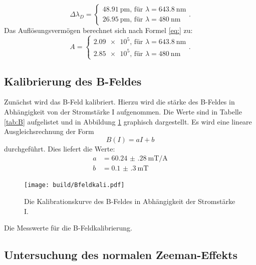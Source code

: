 \[
\Delta\lambda_D =
\begin{cases}
\SI{48.91}{\pico\metre} \text{, für }\lambda=\SI{643.8}{\nano\metre}\\
\SI{26.95}{\pico\metre} \text{, für }\lambda=\SI{480}{\nano\metre}
\end{cases}\text{.}
\]
Das Auflösungsvermögen berechnet sich nach Formel \eqref{eq:} zu:
\[
A = 
\begin{cases}
\num{2.09e5} \text{, für }\lambda=\SI{643.8}{\nano\metre}\\
\num{2.85e5} \text{, für }\lambda=\SI{480}{\nano\metre}
\end{cases}\text{.}
\]

\subsection{Kalibrierung des B-Feldes}

Zunächst wird das B-Feld kalibriert. Hierzu wird die stärke des B-Feldes in Abhängigkeit von der Stromstärke I aufgenommen. Die Werte sind in Tabelle \ref{tab:B} aufgelistet und in Abbildung \ref{fig:B} graphisch dargestellt. Es wird eine lineare Ausgleichsrechnung der Form
\[
B(I) = aI+b
\]
durchgeführt. Dies liefert die Werte:
\begin{align*}
a &= \SI{60.24(28)}{\milli\tesla\per\ampere}\\
b &= \SI{0.1(3)}{\milli\tesla}
\end{align*}

\begin{figure}
	\centering
	\texttt{[image: build/Bfeldkali.pdf]}
	\caption{Die Kalibrationskurve des B-Feldes in Abhängigkeit der Stromstärke I.}
	\label{fig:B}
\end{figure}

\begin{table}
	\centering
	\caption{Die Messwerte für die B-Feldkalibrierung.}
	
	\label{tab:B}
\end{table}

\subsection{Untersuchung des normalen Zeeman-Effekts}


